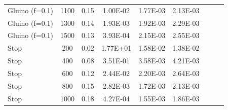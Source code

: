 \begin{table}
\begin{center}
\begin{tabular}{|l|c|c|c|c|c|c|c|c|}
Gluino (f=0.1)       & 1100 &   0.15 & 1.00E-02 & 1.77E-03 & 2.13E-03 \\
Gluino (f=0.1)       & 1300 &   0.14 & 1.93E-03 & 1.92E-03 & 2.29E-03 \\
Gluino (f=0.1)       & 1500 &   0.13 & 3.93E-04 & 2.15E-03 & 2.55E-03 \\
Stop                 &  200 &   0.02 & 1.77E+01 & 1.58E-02 & 1.38E-02 \\
Stop                 &  400 &   0.08 & 3.51E-01 & 3.58E-03 & 4.21E-03 \\
Stop                 &  600 &   0.12 & 2.44E-02 & 2.20E-03 & 2.64E-03 \\
Stop                 &  800 &   0.15 & 2.82E-03 & 1.72E-03 & 2.13E-03 \\
Stop                 & 1000 &   0.18 & 4.27E-04 & 1.55E-03 & 1.86E-03 \\
\hline
  \end{tabular}
 \end{center}
\end{table}

